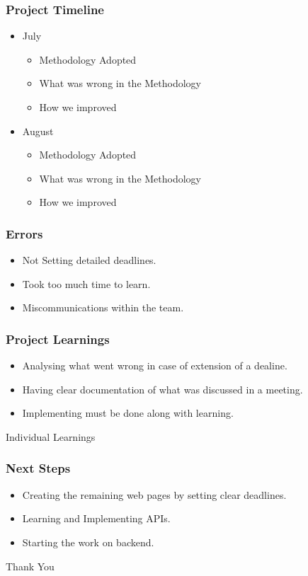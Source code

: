 \documentclass{beamer}
\begin{document}
\begin{frame}
\frametitle{Project Timeline}
\begin{itemize}
  \item July
  \begin{itemize}
    \item Methodology Adopted
    \item What was wrong in the Methodology
    \item How we improved
  \end{itemize}
  \item August
  \begin{itemize}
    \item Methodology Adopted
    \item What was wrong in the Methodology
    \item How we improved
  \end{itemize}

\end{itemize}
\end{frame}

\begin{frame}
  \frametitle{Errors}
  \begin{itemize}
    \item Not Setting detailed deadlines.
    \item Took too much time to learn.
    \item Miscommunications within the team.
  \end{itemize}
  \end{frame}

\begin{frame}
\frametitle{Project Learnings}
\begin{itemize}
  \item Analysing what went wrong in case of extension of a dealine.
  \item Having clear documentation of what was discussed in a meeting.
  \item Implementing must be done along with learning.
\end{itemize}
\end{frame}

\begin{frame}
  \center\Huge Individual Learnings
\end{frame}

\begin{frame}
\frametitle{Next Steps}
\begin{itemize}
  \item Creating the remaining web pages by setting clear deadlines.
  \item Learning and Implementing APIs.
  \item Starting the work on backend.
\end{itemize}
\end{frame}

\begin{frame}
  \center\Huge Thank You
\end{frame}
\end{document}
